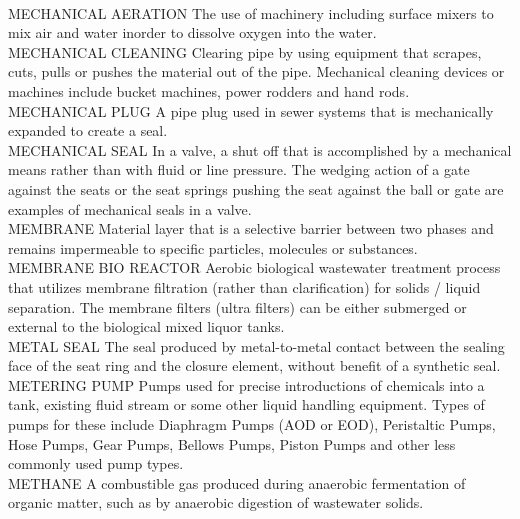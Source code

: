 \documentclass{article}
\begin{document}
\vspace{0.3cm}\\
MECHANICAL AERATION
The use of machinery including surface mixers to mix air and water inorder to dissolve oxygen into the water.
\vspace{0.3cm}\\
MECHANICAL CLEANING
Clearing pipe by using equipment that scrapes, cuts, pulls or pushes the material out of the pipe. Mechanical cleaning devices or machines include bucket machines, power rodders and hand rods. 
\vspace{0.3cm}\\
MECHANICAL PLUG
A pipe plug used in sewer systems that is mechanically expanded to create a seal. 
\vspace{0.3cm}\\
MECHANICAL SEAL
In a valve, a shut off that is accomplished by a mechanical means rather than with fluid or line pressure. The wedging action of a gate against the seats or the seat springs pushing the seat against the ball or gate are examples of mechanical seals in a valve.
\vspace{0.3cm}\\
MEMBRANE
Material layer that is a selective barrier between two phases and remains impermeable to specific particles, molecules or substances.
\vspace{0.3cm}\\
MEMBRANE BIO REACTOR
Aerobic biological wastewater treatment process that utilizes membrane filtration (rather than clarification) for solids / liquid separation. The membrane filters (ultra filters) can be either submerged or external to the biological mixed liquor tanks.
\vspace{0.3cm}\\
METAL SEAL
The seal produced by metal-to-metal contact between the sealing face of the seat ring and the closure element, without benefit of a synthetic seal.
\vspace{0.3cm}\\
METERING PUMP
Pumps used for precise introductions of chemicals into a tank, existing fluid stream or some other liquid handling equipment. Types of pumps for these include Diaphragm Pumps (AOD or EOD), Peristaltic Pumps, Hose Pumps, Gear Pumps, Bellows Pumps, Piston Pumps and other less commonly used pump types.
\vspace{0.3cm}\\
METHANE
A combustible gas produced during anaerobic fermentation of organic matter, such as by anaerobic digestion of wastewater solids.
\end{document}

